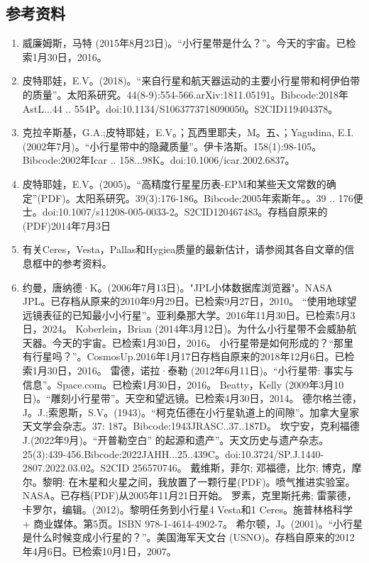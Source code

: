 \subsection{参考资料}
\begin{enumerate}
\item 威廉姆斯，马特 (2015年8月23日)。“小行星带是什么？”。今天的宇宙。已检索1月30日，2016。
\item 皮特耶娃，E.V。(2018)。“来自行星和航天器运动的主要小行星带和柯伊伯带的质量”。太阳系研究。44(8-9):554-566.arXiv:1811.05191。Bibcode:2018年AstL...44 .. 554P。doi:10.1134/S1063773718090050。S2CID119404378。 
\item 克拉辛斯基，G.A.;皮特耶娃，E.V。；瓦西里耶夫，M。五、；Yagudina, E.I.(2002年7月)。“小行星带中的隐藏质量”。伊卡洛斯。158(1):98-105。Bibcode:2002年Icar .. 158...98K。doi:10.1006/icar.2002.6837。
\item 皮特耶娃，E.V。(2005)。“高精度行星星历表-EPM和某些天文常数的确定”(PDF)。太阳系研究。39(3):176-186。Bibcode:2005年索斯年。。39 .. 176便士。doi:10.1007/s11208-005-0033-2。S2CID120467483。存档自原来的(PDF)2014年7月3日  
\item 有关Ceres，Vesta，Pallas和Hygiea质量的最新估计，请参阅其各自文章的信息框中的参考资料。
\item 约曼，唐纳德·K。(2006年7月13日)。"JPL小体数据库浏览器"。NASA JPL。已存档从原来的2010年9月29日。已检索9月27日，2010。
 “使用地球望远镜表征的已知最小小行星”。亚利桑那大学。2016年11月30日。已检索5月3日，2024。
 Koberlein，Brian (2014年3月12日)。为什么小行星带不会威胁航天器。今天的宇宙。已检索1月30日，2016。
 小行星带是如何形成的？“那里有行星吗？”。CosmosUp.2016年1月17日存档自原来的2018年12月6日。已检索1月30日，2016。
 雷德，诺拉·泰勒 (2012年6月11日)。“小行星带: 事实与信息”。Space.com。已检索1月30日，2016。
 Beatty，Kelly (2009年3月10日)。“雕刻小行星带”。天空和望远镜。已检索4月30日，2014。
 德尔格兰德，J。J.;索恩斯，S.V。(1943)。“柯克伍德在小行星轨道上的间隙”。加拿大皇家天文学会杂志。37: 187。Bibcode:1943JRASC..37..187D。
 坎宁安，克利福德J.(2022年9月)。“开普勒空白” 的起源和遗产”。天文历史与遗产杂志。25(3):439-456.Bibcode:2022JAHH...25..439C。doi:10.3724/SP.J.1440-2807.2022.03.02。S2CID 256570746。
 戴维斯，菲尔; 邓福德，比尔; 博克，摩尔。黎明: 在木星和火星之间，我放置了一颗行星(PDF)。喷气推进实验室。NASA。已存档(PDF)从2005年11月21日开始。
 罗素，克里斯托弗; 雷蒙德，卡罗尔，编辑。(2012)。黎明任务到小行星4 Vesta和1 Ceres。施普林格科学 + 商业媒体。第5页。ISBN 978-1-4614-4902-7。
 希尔顿，J。(2001)。“小行星是什么时候变成小行星的？”。美国海军天文台 (USNO)。存档自原来的2012年4月6日。已检索10月1日，2007。

\end{enumerate}
